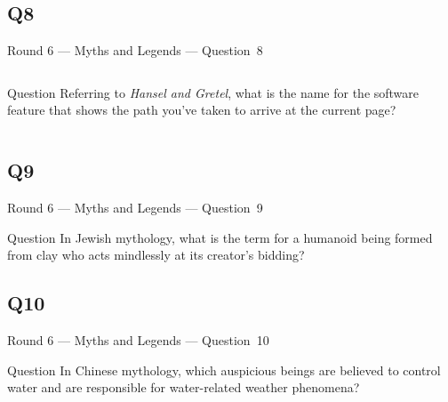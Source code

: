 \documentclass[11pt,draft]{beamer}
\begin{document}
\subsection*{Q8}
\begin{frame}[t]{Round 6 --- Myths and Legends --- \mbox{Question 8}}
    \begin{columns}[T,totalwidth=\linewidth]
        \begin{column}{0.32\linewidth}
            \begin{block}{Question}
                Referring to \emph{Hansel and Gretel}, what is the name for the software feature that shows the path you've taken to arrive at the current page?
            \end{block}
        \end{column}
        \begin{column}{0.65\linewidth}
            \begin{center}
                \texttt{[image: \{Images/breadcrumbs]}.png}
            \end{center}
        \end{column}
    \end{columns}
\end{frame}
\subsection*{Q9}
\begin{frame}[t]{Round 6 --- Myths and Legends --- \mbox{Question 9}}
    \begin{block}{Question}
        In Jewish mythology, what is the term for a humanoid being formed from clay who acts mindlessly at its creator's bidding?
    \end{block}
\end{frame}
\subsection*{Q10}
\begin{frame}[t]{Round 6 --- Myths and Legends --- \mbox{Question 10}}
    \begin{block}{Question}
        In Chinese mythology, which auspicious beings are believed to control water and are responsible for water-related weather phenomena?
    \end{block}
\end{frame}
\end{document}
